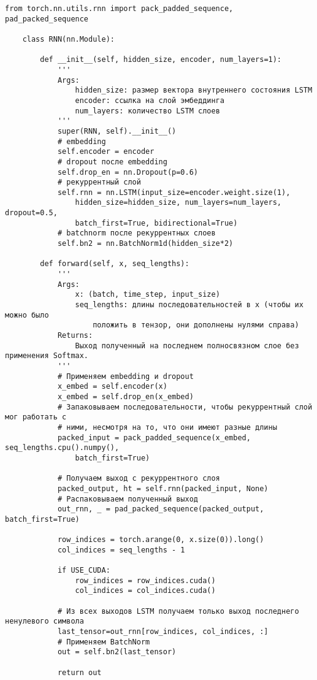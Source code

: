 \begin{verbatim}
from torch.nn.utils.rnn import pack_padded_sequence, pad_packed_sequence
    
    class RNN(nn.Module):
    
        def __init__(self, hidden_size, encoder, num_layers=1):
            '''
            Args:
                hidden_size: размер вектора внутреннего состояния LSTM
                encoder: ссылка на слой эмбеддинга
                num_layers: количество LSTM слоев
            '''
            super(RNN, self).__init__()
            # embedding        
            self.encoder = encoder
            # dropout после embedding
            self.drop_en = nn.Dropout(p=0.6)
            # рекуррентный слой
            self.rnn = nn.LSTM(input_size=encoder.weight.size(1), 
                hidden_size=hidden_size, num_layers=num_layers, dropout=0.5, 
                batch_first=True, bidirectional=True)
            # batchnorm после рекуррентных слоев
            self.bn2 = nn.BatchNorm1d(hidden_size*2)
    
        def forward(self, x, seq_lengths):
            '''
            Args:
                x: (batch, time_step, input_size)
                seq_lengths: длины последовательностей в х (чтобы их можно было 
                    положить в тензор, они дополнены нулями справа)
            Returns:
                Выход полученный на последнем полносвязном слое без применения Softmax.
            '''
            # Применяем embedding и dropout
            x_embed = self.encoder(x)
            x_embed = self.drop_en(x_embed)
            # Запаковываем последовательности, чтобы рекуррентный слой мог работать с 
            # ними, несмотря на то, что они имеют разные длины
            packed_input = pack_padded_sequence(x_embed, seq_lengths.cpu().numpy(), 
                batch_first=True)
    
            # Получаем выход с рекуррентного слоя
            packed_output, ht = self.rnn(packed_input, None)
            # Распаковываем полученный выход
            out_rnn, _ = pad_packed_sequence(packed_output, batch_first=True)
    
            row_indices = torch.arange(0, x.size(0)).long()
            col_indices = seq_lengths - 1
            
            if USE_CUDA:
                row_indices = row_indices.cuda()
                col_indices = col_indices.cuda()
    
            # Из всех выходов LSTM получаем только выход последнего ненулевого символа
            last_tensor=out_rnn[row_indices, col_indices, :]
            # Применяем BatchNorm
            out = self.bn2(last_tensor)
            
            return out
\end{verbatim}

